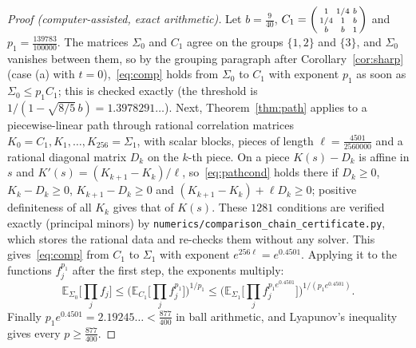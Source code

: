 \documentclass[11pt]{amsart}
\theoremstyle{definition}
\newcommand{\E}{\mathbb{E}}
\begin{document}
\begin{proof}[Proof (computer-assisted, exact arithmetic)]
Let $b=\frac9{40}$, $C_1=\begin{psmallmatrix}1&1/4&b\\1/4&1&b\\b&b&1\end{psmallmatrix}$ and $p_1=\frac{139783}{100000}$.
The matrices $\Sigma_0$ and $C_1$ agree on the groups $\{1,2\}$ and $\{3\}$, and $\Sigma_0$ vanishes between them, so
by the grouping paragraph after Corollary~\ref{cor:sharp} (case (a) with $t=0$),~\eqref{eq:comp} holds from $\Sigma_0$
to $C_1$ with exponent $p_1$ as soon as $\Sigma_0\le p_1C_1$; this is checked exactly (the threshold is
$1/(1-\sqrt{8/5}\,b)=1.3978291\ldots$). Next, Theorem~\ref{thm:path} applies to a piecewise-linear path through
rational correlation matrices $K_0=C_1,K_1,\dots,K_{256}=\Sigma_1$, with scalar blocks, pieces of length
$\ell=\frac{4501}{2560000}$ and a rational diagonal matrix $D_k$ on the $k$-th piece. On a piece $K(s)-D_k$ is affine in
$s$ and $K'(s)=(K_{k+1}-K_k)/\ell$, so~\eqref{eq:pathcond} holds there if $D_k\ge0$, $K_k-D_k\ge0$, $K_{k+1}-D_k\ge0$ and
$(K_{k+1}-K_k)+\ell D_k\ge0$; positive definiteness of all $K_k$ gives that of $K(s)$. These $1281$ conditions are
verified exactly (principal minors) by \texttt{numerics/comparison\_chain\_certificate.py}, which stores the rational
data and re-checks them without any solver. This gives~\eqref{eq:comp} from $C_1$ to $\Sigma_1$ with exponent
$e^{256\ell}=e^{0.4501}$. Applying it to the functions $f_j^{p_1}$ after the first step, the exponents multiply:
\[
\E_{\Sigma_0}\Big[\prod_jf_j\Big]\le\Big(\E_{C_1}\Big[\prod_jf_j^{p_1}\Big]\Big)^{1/p_1}
\le\Big(\E_{\Sigma_1}\Big[\prod_jf_j^{p_1e^{0.4501}}\Big]\Big)^{1/(p_1e^{0.4501})} .
\]
Finally $p_1e^{0.4501}=2.19245\ldots<\frac{877}{400}$ in ball arithmetic, and Lyapunov's inequality gives every
$p\ge\frac{877}{400}$.
\end{proof}
\end{document}
